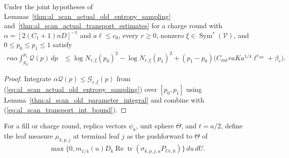 \begin{lemma}
    \label{thm:al_scan_actual_charge_integral_bound}
    \leanok
    Under the joint hypotheses of
    Lemmas~\ref{thm:al_scan_actual_old_entropy_sampling}
    and~\ref{thm:al_scan_actual_transport_estimates} for a charge round with
    $\alpha=[2(C_1+1)nD]^{-1}$ and $a\ell\le c_0$, every $r\ge0$, nonzero
    $\xi\in\operatorname{Sym}^r(\mathcal V)$, and $0\le p_0\le p_1\le1$ satisfy
    \begin{align}
        ra\alpha\int_{p_0}^{p_1}\mathcal Q(p)\,dp
         & \le \log N_{r,\xi}(p_0)^2-\log N_{r,\xi}(p_1)^2
        +(p_1-p_0)\bigl(C_{\mathrm{ent}}raKa^{1/4}\ell^{e_{\mathrm{ent}}}+\beta_r\bigr).
        \label{eq:al_scan_actual_charge_integral_bound}
    \end{align}
\end{lemma}
\begin{proof}\leanok
    Integrate $\alpha\mathcal Q(p)\le\mathcal G_{r,\xi}(p)$ from
    (\ref{eq:al_scan_actual_old_entropy_sampling}) over $[p_0,p_1]$ using
    Lemma~\ref{thm:al_scan_old_parameter_integral} and combine with
    (\ref{eq:al_scan_transport_int_bound}).
\end{proof}

\begin{definition}
    \label{def:al_scan_literal_measures}
    \leanok
    For a fill or charge round, replica vectors $\psi_k$, unit sphere $\Theta$,
    and $t=a/2$, define the leaf measure $\mu_{k,p,j}$ at terminal leaf $j$ as
    the pushforward to $\Theta$ of
    \begin{align}
        \max\{0,m_{1/4}(u)D_k\operatorname{Re}\operatorname{tr}
        (\sigma_{k,p,j,u}P_{Ue,k})\}\,du\,dU.
        \label{eq:al_scan_leaf_density}
    \end{align}
\end{definition}

